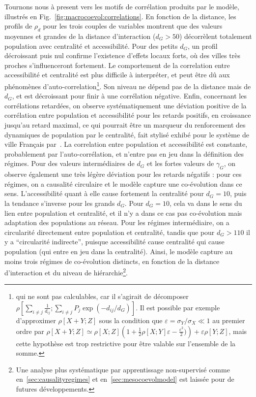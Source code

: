Tournons nous à present vers les motifs de corrélation produits par le modèle, illustrés en Fig.~\ref{fig:macrocoevol:correlations}. En fonction de la distance, les profils de $\rho_d$ pour les trois couples de variables montrent que des valeurs moyennes et grandes de la distance d'interaction ($d_G > 50$) décorrèlent totalement population avec centralité et accessibilité. Pour des petits $d_G$, un profil décroissant puis nul confirme l'existence d'effets locaux forts, où des villes très proches s'influenceront fortement. Le comportement de la correlation entre accessibilité et centralité est plus difficile à interpréter, et peut être dû aux phénomènes d'auto-correlation\footnote{qui ne sont pas calculables, car il s'agirait de décomposer $\rho\left[\sum_{i\neq j} \frac{1}{d_{ij}}; \sum_{i\neq j} P_j \exp{\left(-d_{ij}/d_G\right)}\right]$. Il est possible par exemple d'approximer $\rho\left[X+Y;Z\right]$ sous la condition que $\varepsilon = \sigma_Y / \sigma_X \ll 1$ au premier ordre par $\rho\left[ X+Y;Z \right] \simeq \rho\left[ X;Z \right]\left(1+\frac{1}{2}\rho\left[X;Y\right]\varepsilon - \frac{\varepsilon^2}{2})\right) + \varepsilon \rho\left[Y;Z\right]$, mais cette hypothèse est trop restrictive pour être valable sur l'ensemble de la somme.}. Son niveau ne dépend pas de la distance mais de $d_G$, et est décroissant pour finir à une corrélation négative. Enfin, concernant les corrélations retardées, on observe systématiquement une déviation positive de la corrélation entre population et accessibilité pour les retards positifs, en croissance jusqu'au retard maximal, ce qui pourrait être un marqueur du renforcement des dynamiques de population par le centralité, fait stylisé exhibé pour le système de ville Français par~\cite{bretagnolle:tel-00459720}. La correlation entre population et accessibilité est constante, probablement par l'auto-corrélation, et n'entre pas en jeu dans la définition des régimes. Pour des valeurs intermédiaires de $d_G$ et les fortes valeurs de $\gamma_G$, on observe également une très légère déviation pour les retards négatifs : pour ces régimes, on a causalité circulaire et le modèle capture une co-évolution dans ce sens. L'accessibilité quant à elle cause fortement la centralité pour $d_G = 10$, puis la tendance s'inverse pour les grands $d_G$. Pour $d_G = 10$, cela va dans le sens du lien entre population et centralité, et il n'y a dans ce cas pas co-évolution mais adaptation des populations au réseau. Pour les régimes intermédiaire, on a circularité directement entre population et centralité, tandis que pour $d_G > 110$ il y a ``circularité indirecte'', puisque accessibilité cause centralité qui cause population (qui entre en jeu dans la centralité). Ainsi, le modèle capture au moins trois régimes de co-évolution distincts, en fonction de la distance d'interaction et du niveau de hiérarchie\footnote{Une analyse plus systématique par apprentissage non-supervisé comme en~\ref{sec:causalityregimes} et en~\ref{sec:mesocoevolmodel} est laissée pour de futures développements.}.







